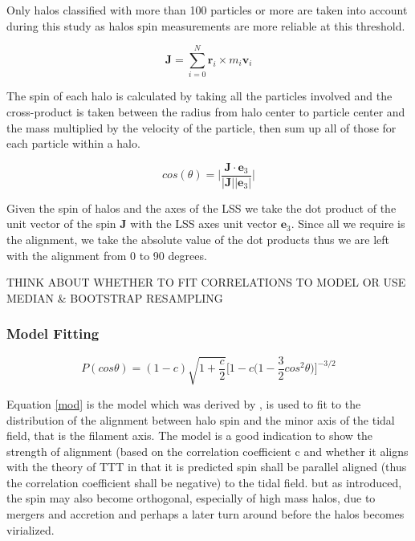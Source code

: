 \documentclass[a4paper,fleqn,usenatbib]{mnras}
\begin{document}
Only halos classified with more than 100 particles or more are taken into account during this study as halos spin measurements are more reliable at this threshold. 
\begin{ceqn}
\begin{equation}
\textbf{J}=\sum_{i=0}^{N}\textbf{r}_i\times m_i\textbf{v}_i \label{AM}
\end{equation}
\end{ceqn}
The spin of each halo is calculated by taking all the particles involved and the cross-product is taken between the radius from halo center to particle center and the mass multiplied by the velocity of the particle, then sum up all of those for each particle within a halo.
\begin{ceqn}
\begin{equation}
cos(\theta)=\bigg|\frac{\textbf{J}\cdot \textbf{e}_{3}}{|\textbf{J}| |\textbf{e}_{3}|}\bigg|\label{dotprod}
\end{equation}
\end{ceqn}
Given the spin of halos and the axes of the LSS we take the dot product of the unit vector of the spin \textbf{J} with the LSS axes unit vector $\textbf{e}_{3}$.
Since all we require is the alignment, we take the absolute value of the dot products thus we are left with the alignment from 0 to 90 degrees. 

THINK ABOUT WHETHER TO FIT CORRELATIONS TO MODEL OR USE MEDIAN \& BOOTSTRAP RESAMPLING
\subsubsection{Model Fitting} 
\begin{ceqn}
\begin{equation}
\textit{P}(cos\theta)=(1-c)\sqrt{1+\frac{c}{2}}\Big[1-c\Big(1-\frac{3}{2}cos^{2}\theta\Big)\Big]^{-3/2} \label{mod}
\end{equation}
\end{ceqn}
Equation \ref{mod} is the model which was derived by \citet{Lee_11}, is used to fit to the distribution of the alignment between halo spin and the minor axis of the tidal field, that is the filament axis. The model is a good indication to show the strength of alignment (based on the correlation coefficient c and whether it aligns with the theory of TTT in that it is predicted spin shall be parallel aligned (thus the correlation coefficient shall be negative) to the tidal field. but as introduced, the spin may also become orthogonal, especially of high mass halos, due to mergers and accretion and perhaps a later turn around before the halos becomes virialized.
\end{document}
